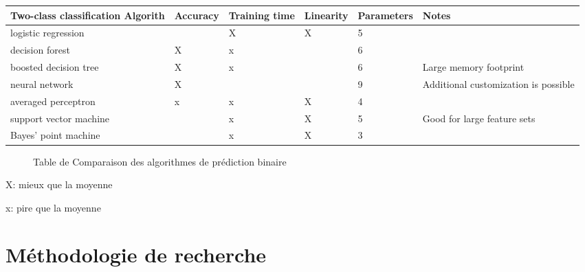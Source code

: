 \documentclass[12pt]{article}
\begin{document}
{\begin{center}
\begin{tabular}{|p{3cm}|p{2cm}|p{2cm}|p{2cm}|p{2cm}|p{3cm}|}
  Two-class classification Algorith & Accuracy & Training time & Linearity & Parameters & Notes  \\
  \hline
 logistic regression & & X  & X  &5&  \\
  \hline
  decision forest & X & x & &6 &  \\
  \hline
  boosted decision tree &  X &x& &6&Large memory footprint  \\
  \hline
  neural network & X & & &9&Additional customization is possible\\
  \hline
  averaged perceptron & x &x &X & 4 & \\
  \hline
  support vector machine & &x &X &5&Good for large feature sets   \\
  \hline
   Bayes’ point machine & & x&X &3 &  \\
  \hline
\end{tabular}
\end{center}
\begin{figure}[H]
	\centering
    
     \caption{ Table de Comparaison des algorithmes de prédiction binaire }
    \label{fig:18}
\end{figure}


X: mieux que la moyenne

x: pire que la moyenne

\section{Méthodologie de recherche}
}
\end{document}
